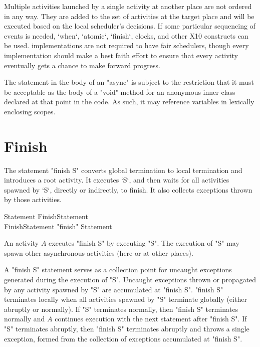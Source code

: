 Multiple activities launched by a single activity at another place are not
ordered in any way. They are added to the set of activities at the target
place and will be executed based on the local scheduler's decisions.
If some particular sequencing of events is needed, \xcd`when`, \xcd`atomic`,
\xcd`finish`, clocks, and other X10 constructs can be used.
\Xten{} implementations are not required to have fair schedulers,
though every implementation should make a best faith effort to ensure
that every activity eventually gets a chance to make forward progress.

\begin{staticrule*}
The statement in the body of an \xcd"async" is subject to the
restriction that it must be acceptable as the body of a \xcd"void"
method for an anonymous inner class declared at that point in the code. As
such, it may reference 
variables in lexically enclosing scopes.
\end{staticrule*}

\section{Finish}\label{finish}
The statement \xcd"finish S" converts global termination to local
termination and introduces a root activity.   It executes \xcd`S`, and then
waits for all activities spawned by \xcd`S`, directly or indirectly, to
finish. It also collects exceptions thrown by those activities.

\begin{grammar}
Statement \: FinishStatement \\
FinishStatement \: \xcd"finish" Statement 
\end{grammar}

An activity $A$ executes \xcd"finish S" by executing \xcd"S".  The
execution of \xcd"S" may spawn other asynchronous activities (here or
at other places).  

A \xcd"finish S" statement serves as a collection point for
uncaught exceptions generated during the execution of \xcd"S".
Uncaught exceptions thrown or propagated by any
activity spawned by \xcd"S" are accumulated at \xcd"finish S".
\xcd"finish S" terminates locally when all activities spawned by
\xcd"S" terminate globally (either abruptly or normally). If \xcd"S"
terminates normally, then \xcd"finish S" terminates normally and $A$
continues execution with the next statement after \xcd"finish S".  If
\xcd"S" terminates abruptly, then \xcd"finish S" terminates abruptly
and throws a single exception, 
formed from the collection of exceptions accumulated at \xcd"finish S".


